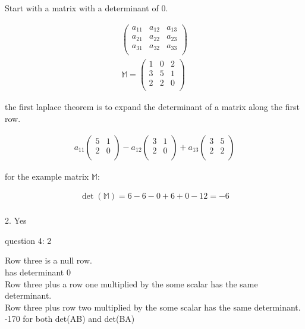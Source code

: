 \documentclass{article}
\begin{document}
Start with a matrix with a determinant of 0.

\begin{align}
\begin{pmatrix}
a_11 & a_12 & a_13 \\
a_21 & a_22 & a_23 \\
a_31 & a_32 & a_33 \\
\end{pmatrix} \\
\mathbb{M} = 
\begin{pmatrix}
1 & 0 & 2 \\
3 & 5 & 1 \\
2 & 2 & 0 \\
\end{pmatrix}
\end{align}

the first laplace theorem is to expand the determinant of a matrix along the first row. 

\begin{align}
a_11 \begin{pmatrix}
5 & 1 \\
2 & 0 \\
\end{pmatrix}
- a_12 \begin{pmatrix}
3 & 1 \\
2 & 0 \\
\end{pmatrix}
+ a_13 \begin{pmatrix}
3 & 5 \\
2 & 2 \\
\end{pmatrix}
\end{align}

for the example matrix $\mathbb{M}$:

\begin{align}
\det(\mathbb{M}) = 6 - 6 - 0 + 6 + 0 - 12 = -6 \\ 
\end{align}

2. Yes

question 4: 2

Row three is a null row. \\
has determinant 0 \\
Row three plus a row one multiplied by the some scalar has the same determinant. \\
Row three plus row two multiplied by the some scalar has the same determinant. \\
-170 \textrm{for both det(}AB\textrm{) and det(}BA\textrm{)}
\end{document}
